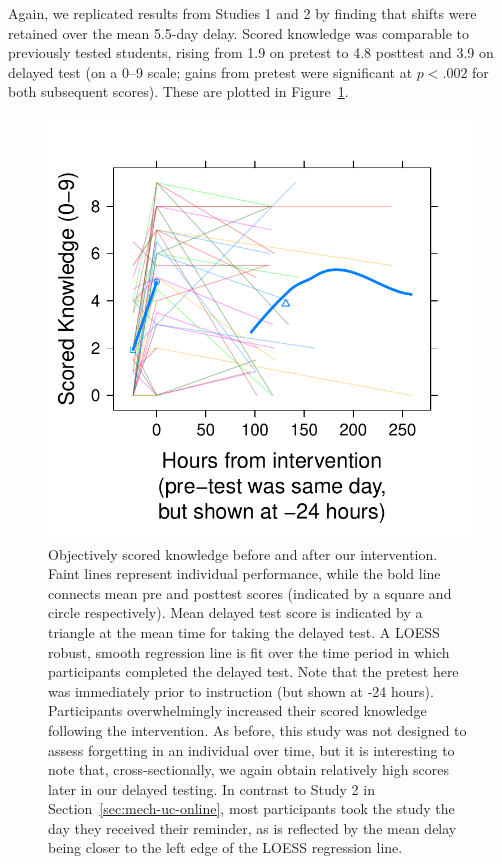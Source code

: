 Again, we replicated results from Studies 1 and 2 by finding that shifts were
retained over the mean 5.5-day delay. Scored knowledge was comparable to
previously tested students, rising from 1.9 on pretest to 4.8 posttest and 3.9
on delayed test (on a 0--9 scale; gains from pretest were significant at
$p<.002$ for both subsequent scores). These are plotted in
Figure~\ref{fig:CCO-mech-scored}. 

\begin{figure}
    \centering
    \includegraphics{CCO-mech-scored.pdf}
    \caption{Objectively scored knowledge before and after our intervention.
        Faint lines represent individual performance, while the bold line
        connects mean pre and posttest scores (indicated by a square and circle
        respectively). Mean delayed test score is indicated by a triangle at the
        mean time for taking the delayed test. A LOESS robust, smooth regression
        line is fit over the time period in which participants completed the
        delayed test.  Note that the pretest here was immediately prior to
        instruction (but shown at -24 hours). Participants overwhelmingly
        increased their scored knowledge following the intervention. As before,
        this study was not designed to assess forgetting in an individual over
        time, but it is interesting to note that, cross-sectionally, we again
        obtain relatively high scores later in our delayed testing. In contrast
        to Study 2 in Section~\ref{sec:mech-uc-online}, most participants took
        the study the day they received their reminder, as is reflected by the
        mean delay being closer to the left edge of the LOESS regression line.}
    \label{fig:CCO-mech-scored}
\end{figure}

